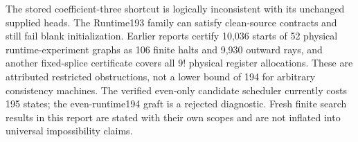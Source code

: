 The stored coefficient-three shortcut is logically inconsistent with its
unchanged supplied heads. The Runtime193 family can satisfy clean-source
contracts and still fail blank initialization. Earlier reports certify
10,036 starts of 52 physical runtime-experiment graphs as 106 finite halts
and 9,930 outward rays, and another fixed-splice certificate covers all
$9!$ physical register allocations. These are attributed restricted
obstructions, not a lower bound of 194 for arbitrary consistency machines.
The verified even-only candidate scheduler currently costs 195 states;
the even-runtime194 graft is a rejected diagnostic. Fresh finite search
results in this report are stated with their own scopes and are not
inflated into universal impossibility claims.
